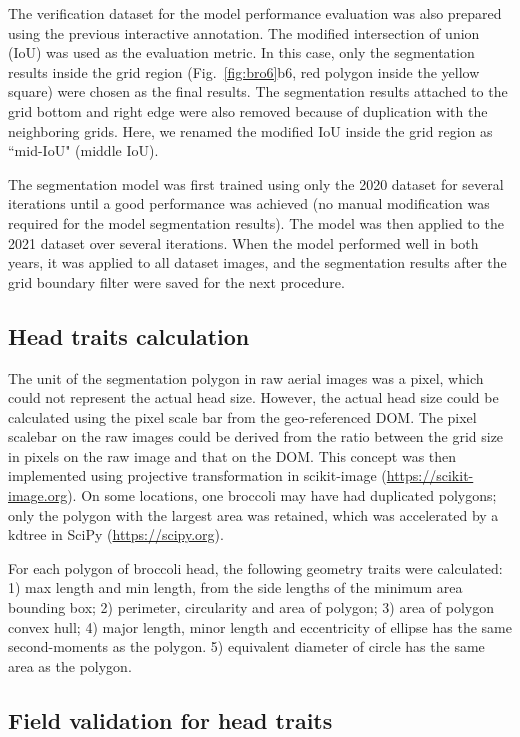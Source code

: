 The verification dataset for the model performance evaluation was also prepared using the previous interactive annotation. The modified intersection of union (IoU) was used as the evaluation metric. In this case, only the segmentation results inside the grid region (Fig.~\ref{fig:bro6}b6, red polygon inside the yellow square) were chosen as the final results. The segmentation results attached to the grid bottom and right edge were also removed because of duplication with the neighboring grids. Here, we renamed the modified IoU inside the grid region as ``mid-IoU" (middle IoU).

The segmentation model was first trained using only the 2020 dataset for several iterations until a good performance was achieved (no manual modification was required for the model segmentation results). The model was then applied to the 2021 dataset over several iterations. When the model performed well in both years, it was applied to all dataset images, and the segmentation results after the grid boundary filter were saved for the next procedure.

\subsection{Head traits calculation}

The unit of the segmentation polygon in raw aerial images was a pixel, which could not represent the actual head size. However, the actual head size could be calculated using the pixel scale bar from the geo-referenced DOM. The pixel scalebar on the raw images could be derived from the ratio between the grid size in pixels on the raw image and that on the DOM. This concept was then implemented using projective transformation in scikit-image (\url{https://scikit-image.org}). On some locations, one broccoli may have had duplicated polygons; only the polygon with the largest area was retained, which was accelerated by a \gls{kdtree} in SciPy (\url{https://scipy.org}).

For each polygon of broccoli head, the following geometry traits were calculated: 1) max length and min length, from the side lengths of the minimum area bounding box; 2) perimeter, circularity and area of polygon; 3) area of polygon convex hull; 4) major length, minor length and eccentricity of ellipse has the same second-moments as the polygon. 5) equivalent diameter of circle has the same area as the polygon.

\subsection{Field validation for head traits}

